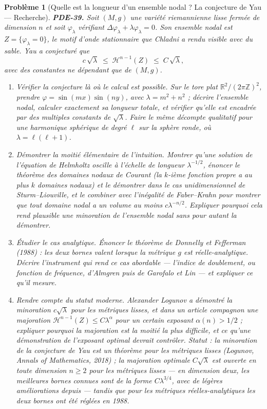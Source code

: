 \documentclass[11pt]{article}
\newtheorem{problem}{Problème}
\begin{document}
\begin{problem}[{Quelle est la longueur d'un ensemble nodal ? La conjecture de Yau --- Recherche}]
\textbf{PDE-39.} Soit $(M,g)$ une variété riemannienne lisse fermée de dimension $n$ et
soit $\varphi_\lambda$ vérifiant $\Delta \varphi_\lambda + \lambda \varphi_\lambda = 0$. Son
\textit{ensemble nodal} est $Z = \{\varphi_\lambda = 0\}$, le motif d'onde stationnaire que
Chladni a rendu visible avec du sable. Yau a conjecturé que
\[ c\,\sqrt{\lambda} \;\le\; \mathcal{H}^{n-1}(Z) \;\le\; C\,\sqrt{\lambda}, \]
avec des constantes ne dépendant que de $(M,g)$.
\begin{enumerate}
\item[(a)] Vérifier la conjecture là où le calcul est possible. Sur le tore plat
$\mathbb{R}^2/(2\pi\mathbb{Z})^2$, prendre $\varphi = \sin(mx)\sin(ny)$, avec
$\lambda = m^2 + n^2$ ; décrire l'ensemble nodal, calculer exactement sa longueur totale, et
vérifier qu'elle est encadrée par des multiples constants de $\sqrt{\lambda}$. Faire le même
décompte qualitatif pour une harmonique sphérique de degré $\ell$ sur la sphère ronde, où
$\lambda = \ell(\ell+1)$.
\item[(b)] Démontrer la moitié élémentaire de l'intuition. Montrer qu'une solution de l'équation de
Helmholtz oscille à l'échelle de longueur $\lambda^{-1/2}$, énoncer le théorème des domaines
nodaux de Courant (la $k$-ième fonction propre a au plus $k$ domaines nodaux) et le démontrer
dans le cas unidimensionnel de Sturm--Liouville, et le combiner avec l'inégalité de Faber--Krahn
pour montrer que tout domaine nodal a un volume au moins $c\lambda^{-n/2}$. Expliquer pourquoi
cela rend plausible une minoration de l'ensemble nodal sans pour autant la démontrer.
\item[(c)] Étudier le cas analytique. Énoncer le théorème de Donnelly et Fefferman (1988) : les deux
bornes valent lorsque la métrique $g$ est réelle-analytique. Décrire l'instrument qui rend ce
cas abordable --- l'indice de doublement, ou fonction de fréquence, d'Almgren puis de Garofalo et
Lin --- et expliquer ce qu'il mesure.
\item[(d)] Rendre compte du statut moderne. Alexander Logunov a démontré la minoration
$c\sqrt{\lambda}$ pour les métriques lisses, et dans un article compagnon une majoration
$\mathcal{H}^{n-1}(Z) \le C\lambda^{\alpha}$ pour un certain exposant $\alpha(n) > 1/2$ ;
expliquer pourquoi la majoration est la moitié la plus difficile, et ce qu'une démonstration de
l'exposant optimal devrait contrôler.
\textit{Statut : la minoration de la conjecture de Yau est un théorème pour les métriques lisses
(Logunov, Annals of Mathematics, 2018) ; la majoration optimale $C\sqrt{\lambda}$ est ouverte en
toute dimension $n \ge 2$ pour les métriques lisses --- en dimension deux, les meilleures bornes
connues sont de la forme $C\lambda^{3/4}$, avec de légères améliorations depuis --- tandis que
pour les métriques réelles-analytiques les deux bornes ont été réglées en 1988.}
\end{enumerate}

\end{problem}
\end{document}

